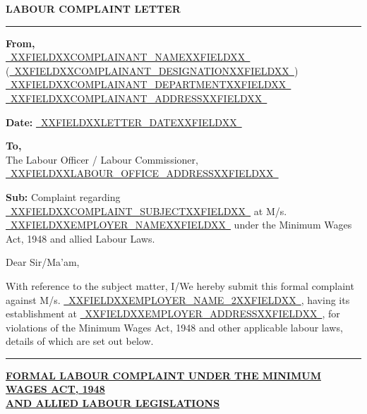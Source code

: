 \documentclass[12pt,a4paper]{article}
\newcommand{\fillline}[1]{\underline{~#1~}}
\begin{document}
\begin{center}
    {\LARGE\textbf{LABOUR COMPLAINT LETTER}}\\[0.5em]
    \rule{\linewidth}{0.4pt}
\end{center}

\vspace{0.5em}

\noindent\textbf{From,}\\
\fillline{XXFIELDXXCOMPLAINANT_NAMEXXFIELDXX} (\fillline{XXFIELDXXCOMPLAINANT_DESIGNATIONXXFIELDXX})\\
\fillline{XXFIELDXXCOMPLAINANT_DEPARTMENTXXFIELDXX}\\
\fillline{XXFIELDXXCOMPLAINANT_ADDRESSXXFIELDXX}

\vspace{0.5em}
\noindent\textbf{Date:} \fillline{XXFIELDXXLETTER_DATEXXFIELDXX}

\vspace{1em}

\noindent\textbf{To,}\\
The Labour Officer / Labour Commissioner,\\
\fillline{XXFIELDXXLABOUR_OFFICE_ADDRESSXXFIELDXX}

\vspace{1em}

\noindent\textbf{Sub:} Complaint regarding \fillline{XXFIELDXXCOMPLAINT_SUBJECTXXFIELDXX} at M/s.
\fillline{XXFIELDXXEMPLOYER_NAMEXXFIELDXX} under the Minimum Wages Act, 1948 and allied Labour Laws.

\vspace{0.5em}

\noindent Dear Sir/Ma'am,

\vspace{0.5em}

\noindent With reference to the subject matter, I/We hereby submit this formal complaint
against M/s. \fillline{XXFIELDXXEMPLOYER_NAME_2XXFIELDXX}, having its establishment at
\fillline{XXFIELDXXEMPLOYER_ADDRESSXXFIELDXX}, for violations of the Minimum Wages Act, 1948 and other
applicable labour laws, details of which are set out below.

\vspace{1em}
\rule{\linewidth}{0.4pt}

\begin{center}
    \uline{\textbf{FORMAL LABOUR COMPLAINT UNDER THE MINIMUM WAGES ACT, 1948}}\\
    \uline{\textbf{AND ALLIED LABOUR LEGISLATIONS}}
\end{center}
\end{document}
